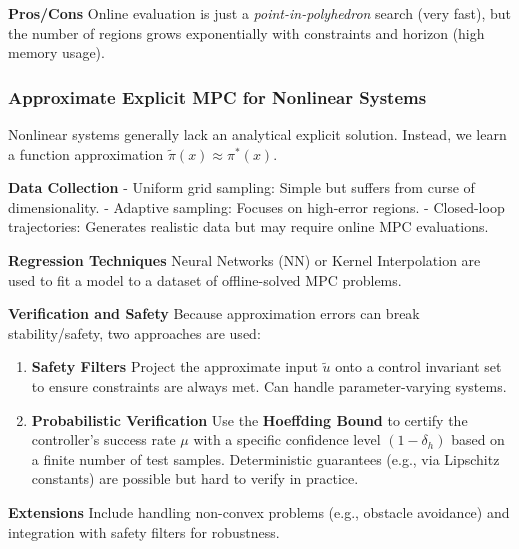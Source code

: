 \textbf{Pros/Cons}
Online evaluation is just a \textit{point-in-polyhedron} search (very fast),
but the number of regions grows exponentially with
constraints and horizon (high memory usage).

\subsubsection{Approximate Explicit MPC for Nonlinear Systems}

Nonlinear systems generally lack an analytical explicit solution.
Instead, we learn a function approximation $\tilde{\pi}(x) \approx \pi^*(x)$.

\textbf{Data Collection}
- Uniform grid sampling: Simple but suffers from curse of dimensionality.
- Adaptive sampling: Focuses on high-error regions.
- Closed-loop trajectories: Generates realistic data but may require
online MPC evaluations.

\textbf{Regression Techniques}
Neural Networks (NN) or Kernel Interpolation are used
to fit a model to a dataset of offline-solved MPC problems.

\textbf{Verification and Safety}
Because approximation errors can break stability/safety,
two approaches are used:

\begin{enumerate}
  \item \textbf{Safety Filters}
    Project the approximate input $\tilde{u}$ onto a control invariant set
    to ensure constraints are always met. Can handle parameter-varying systems.
  \item \textbf{Probabilistic Verification}
    Use the \textbf{Hoeffding Bound} to certify
    the controller’s success rate $\mu$ with a specific
    confidence level $(1-\delta_h)$ based on a finite number of test samples.
    Deterministic guarantees (e.g., via Lipschitz constants) are
    possible but hard to verify in practice.
\end{enumerate}

\textbf{Extensions}
Include handling non-convex problems (e.g., obstacle avoidance) and
integration with safety filters for robustness.

